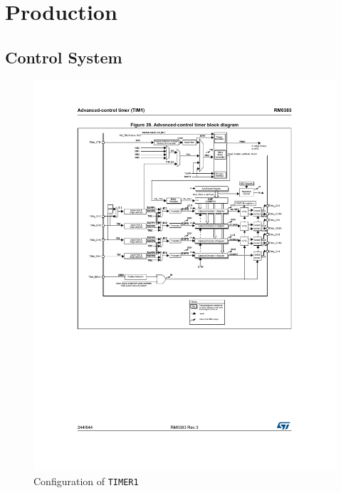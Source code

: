 \chapter{Production}
\section{Control System}
\begin{figure}[htbp]
	\centering
	\includegraphics[width=.8\textwidth]{Figures/4_advanced_timer1_diagram.pdf}
	\caption{Configuration of \texttt{TIMER1}}
	\label{fig:4_timer1}
\end{figure}
